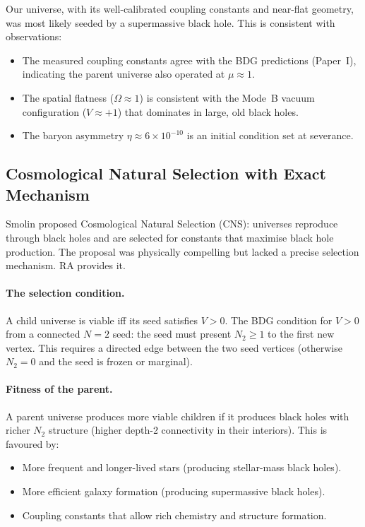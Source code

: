 \documentclass[12pt,a4paper]{article}
\begin{document}
Our universe, with its well-calibrated coupling constants and near-flat geometry, was most likely seeded by a supermassive black hole.  This is consistent with observations:
\begin{itemize}
  \item The measured coupling constants agree with the BDG predictions (Paper~I), indicating the parent universe also operated at $\mu\approx1$.
  \item The spatial flatness ($\Omega\approx1$) is consistent with the Mode~B vacuum configuration ($V\approx+1$) that dominates in large, old black holes.
  \item The baryon asymmetry $\eta\approx6\times10^{-10}$ is an initial condition set at severance.
\end{itemize}

\subsection{Cosmological Natural Selection with Exact Mechanism}

Smolin \cite{Smolin1992} proposed Cosmological Natural Selection (CNS): universes reproduce through black holes and are selected for constants that maximise black hole production.  The proposal was physically compelling but lacked a precise selection mechanism.  RA provides it.

\paragraph{The selection condition.}  A child universe is viable iff its seed satisfies $V>0$.  The BDG condition for $V>0$ from a connected $N=2$ seed: the seed must present $N_2\geq1$ to the first new vertex.  This requires a directed edge between the two seed vertices (otherwise $N_2=0$ and the seed is frozen or marginal).

\paragraph{Fitness of the parent.}  A parent universe produces more viable children if it produces black holes with richer $N_2$ structure (higher depth-2 connectivity in their interiors).  This is favoured by:
\begin{itemize}
  \item More frequent and longer-lived stars (producing stellar-mass black holes).
  \item More efficient galaxy formation (producing supermassive black holes).
  \item Coupling constants that allow rich chemistry and structure formation.
\end{itemize}
\end{document}

